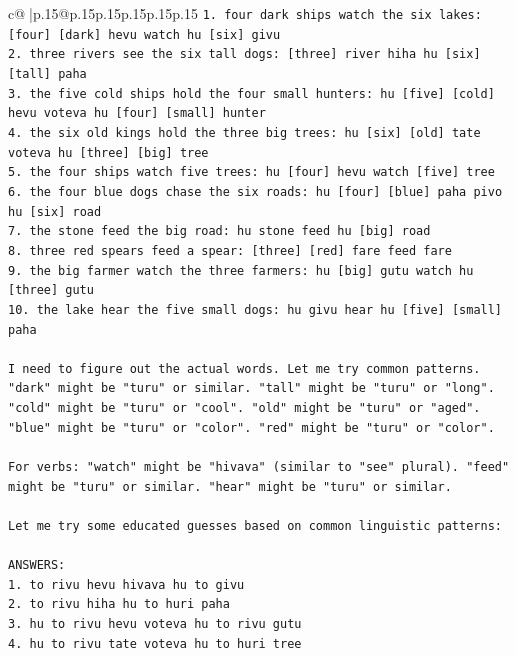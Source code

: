 \documentclass{article}
\begin{document}
{\begin{supertabular}{c@{$\;$}|p{.15\linewidth}@{}p{.15\linewidth}p{.15\linewidth}p{.15\linewidth}p{.15\linewidth}p{.15\linewidth}}
{{{\texttt{1. four dark ships watch the six lakes: {[}four{]} {[}dark{]} hevu watch hu {[}six{]} givu} \\
\texttt{2. three rivers see the six tall dogs: {[}three{]} river hiha hu {[}six{]} {[}tall{]} paha} \\
\texttt{3. the five cold ships hold the four small hunters: hu {[}five{]} {[}cold{]} hevu voteva hu {[}four{]} {[}small{]} hunter} \\
\texttt{4. the six old kings hold the three big trees: hu {[}six{]} {[}old{]} tate voteva hu {[}three{]} {[}big{]} tree} \\
\texttt{5. the four ships watch five trees: hu {[}four{]} hevu watch {[}five{]} tree} \\
\texttt{6. the four blue dogs chase the six roads: hu {[}four{]} {[}blue{]} paha pivo hu {[}six{]} road} \\
\texttt{7. the stone feed the big road: hu stone feed hu {[}big{]} road} \\
\texttt{8. three red spears feed a spear: {[}three{]} {[}red{]} fare feed fare} \\
\texttt{9. the big farmer watch the three farmers: hu {[}big{]} gutu watch hu {[}three{]} gutu} \\
\texttt{10. the lake hear the five small dogs: hu givu hear hu {[}five{]} {[}small{]} paha} \\
\\ 
\texttt{I need to figure out the actual words. Let me try common patterns. "dark" might be "turu" or similar. "tall" might be "turu" or "long". "cold" might be "turu" or "cool". "old" might be "turu" or "aged". "blue" might be "turu" or "color". "red" might be "turu" or "color".} \\
\\ 
\texttt{For verbs: "watch" might be "hivava" (similar to "see" plural). "feed" might be "turu" or similar. "hear" might be "turu" or similar.} \\
\\ 
\texttt{Let me try some educated guesses based on common linguistic patterns:} \\
\\ 
\texttt{ANSWERS:} \\
\texttt{1. to rivu hevu hivava hu to givu} \\
\texttt{2. to rivu hiha hu to huri paha} \\
\texttt{3. hu to rivu hevu voteva hu to rivu gutu} \\
\texttt{4. hu to rivu tate voteva hu to huri tree} \\
}}}
\end{supertabular}}
\end{document}
